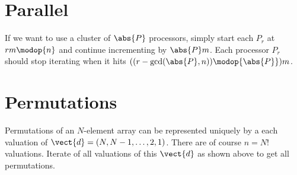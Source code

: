 \section{Parallel}

If we want to use a cluster of $\abs{P}$ processors, simply start each $P_r$ at $r m\modop{n}$ and continue incrementing by $\abs{P}m$.
Each processor $P_r$ should stop iterating when it hits $((r - \gcd(\abs{P},n)) \modop{\abs{P}}) m$.

\section{Permutations}

Permutations of an $N$-element array can be represented uniquely by a each valuation of $\vect{d}=(N,N-1,\dots,2,1)$.
There are of course $n=N!$ valuations.
Iterate of all valuations of this $\vect{d}$ as shown above to get all permutations.



